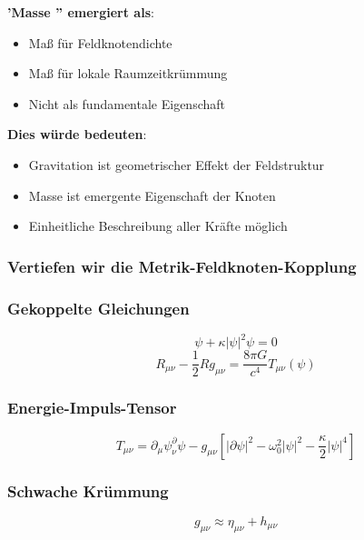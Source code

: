 \documentclass[12pt,a4paper]{article}
\begin{document}
	\textbf{'Masse '' emergiert als}:
	\begin{itemize}
		\item Maß für Feldknotendichte
		\item Maß für lokale Raumzeitkrümmung
		\item Nicht als fundamentale Eigenschaft
	\end{itemize}
	
	\textbf{Dies würde bedeuten}:
	\begin{itemize}
		\item Gravitation ist geometrischer Effekt der Feldstruktur
		\item Masse ist emergente Eigenschaft der Knoten
		\item Einheitliche Beschreibung aller Kräfte möglich
	\end{itemize}
	
	
	
	\subsubsection{Vertiefen wir die Metrik-Feldknoten-Kopplung}
	
	\subsubsection{Gekoppelte Gleichungen}
	\begin{equation}
		[g^{\mu\nu}\partial_\mu\partial_\nu + \omega_0^2]\psi + \kappa|\psi|^2\psi = 0
	\end{equation}
	\begin{equation}
		R_{\mu\nu} - \frac{1}{2}Rg_{\mu\nu} = \frac{8\pi G}{c^4} T_{\mu\nu}(\psi)
	\end{equation}
	
	\subsubsection{Energie-Impuls-Tensor}
	\begin{equation}
		T_{\mu\nu} = \partial_\mu \psi^ \partial_\nu \psi - g_{\mu\nu} \left[|\partial \psi|^2 - \omega_0^2|\psi|^2 - \frac{\kappa}{2}|\psi|^4\right]
	\end{equation}
	
	\subsubsection{Schwache Krümmung}
	\begin{equation}
		g_{\mu\nu} \approx \eta_{\mu\nu} + h_{\mu\nu}
	\end{equation}
	
\end{document}
